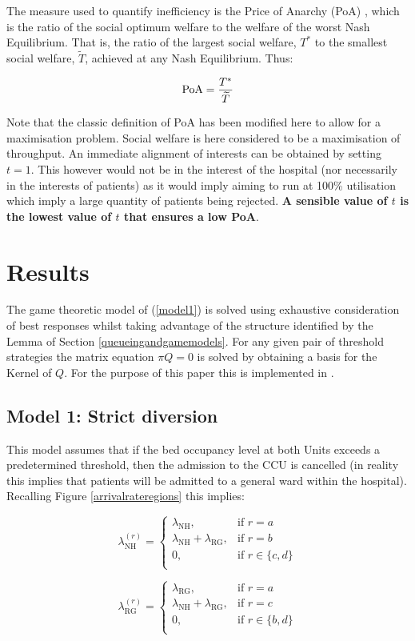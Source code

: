 \documentclass{article}
\newcommand{\NH}{\text{NH}}
\newcommand{\RG}{\text{RG}}
\begin{document}
The measure used to quantify inefficiency is the Price of Anarchy (PoA) \cite{Koutsoupias1999,TimRoughgarden}, which is the ratio of the social optimum welfare to the welfare of the worst Nash Equilibrium.
That is, the ratio of the largest social welfare, $T^*$ to the smallest social welfare, $\widetilde{T}$, achieved at any Nash Equilibrium. Thus:

$$\text{PoA}={{T^*}\over{\widetilde{T}}}$$

Note that the classic definition of PoA has been modified here to allow for a maximisation problem.
Social welfare is here considered to be a maximisation of throughput.
An immediate alignment of interests can be obtained by setting $t=1$.
This however would not be in the interest of the hospital (nor necessarily in the interests of patients) as it would imply aiming to run at 100\% utilisation which imply a large quantity of patients being rejected.
\textbf{A sensible value of $t$ is the lowest value of $t$ that ensures a low PoA}.

\section{Results}\label{results}

The game theoretic model of (\ref{model1}) is solved using exhaustive consideration of best responses whilst taking advantage of the structure identified by the Lemma of Section \ref{queueingandgamemodels}. For any given pair of threshold strategies the matrix equation $\pi Q=0$ is solved by obtaining a basis for the Kernel of $Q$. For the purpose of this paper this is implemented in \cite{sage}.

\subsection{Model 1: Strict diversion}

This model assumes that if the bed occupancy level at both Units exceeds a predetermined threshold, then the admission to the CCU is cancelled (in reality this implies that patients will be admitted to a general ward within the hospital).
Recalling Figure \ref{arrivalrateregions} this implies:

\begin{minipage}[t]{0.5\textwidth}
\small{$$\lambda_{\NH}^{(r)}=\begin{cases}
\lambda_{\NH}, &\text{if }r=a\\
\lambda_{\NH}+\lambda_{\RG},  &\text{if }r=b\\
0, &\text{if }r\in\{c,d\}\\
\end{cases}$$}
\end{minipage}
\begin{minipage}[t]{0.5\textwidth}
\small{$$\lambda_{\RG}^{(r)}=\begin{cases}
\lambda_{\RG}, &\text{if }r=a\\
\lambda_{\NH}+\lambda_{\RG},  &\text{if }r=c\\
0, &\text{if }r\in\{b,d\}\\
\end{cases}$$}
\end{minipage}
\end{document}
